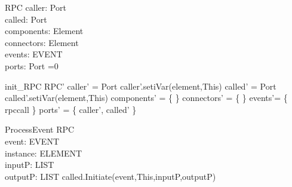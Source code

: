 \begin{schema}{RPC}
caller:  Port \\
called: Port \\
components: \pset Element \\
connectors: \pset Element \\
events: \pset EVENT \\
ports: \pset Port 
=0
\end{schema}


\begin{zed}
init\_RPC \sdef \lsch RPC' \bbar caller' = \new Port \land caller'.setiVar(element,This) \land called' = \new Port \land called'.setiVar(element,This) \land  components' = \{ \} \land  connectors' = \{ \} \land events'= \{ rpccall \} \land ports' = \{ caller', called' \} \rsch  \end{zed}

\begin{schema}{ProcessEvent}
\Delta RPC \\
event: EVENT \\
instance: ELEMENT \\
inputP: LIST \\
outputP: LIST 
\where called.Initiate(event,This,inputP,outputP)
\end{schema}
